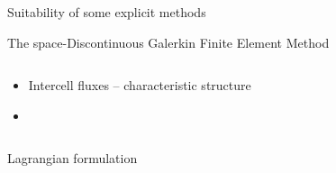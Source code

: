 \begin{withoutheadline}
\begin{frame}{Suitability of some explicit methods}
\begin{block}{The space-Discontinuous Galerkin Finite Element Method \cite{Cockburn}}
\begin{overprint}
\begin{columns}
\begin{footnotesize}
\begin{column}{0.6\textwidth}
              \begin{itemize}
              \item[] Intercell fluxes -- characteristic structure
              \item[] %
              \end{itemize}
            \end{column}
          \end{footnotesize}
        \end{columns}
        \vskip -10pt
        \begin{columns}
          \begin{column}{0.48\textwidth}
            \begin{block}{\footnotesize Lagrangian formulation \cite{LagrangianDG_thesis}}
              \centering
                
                
            \end{block}
          \end{column}
          \begin{column}{0.48\textwidth}
            

\end{column}
\end{columns}
\end{overprint}
\end{block}
\end{frame}
\end{withoutheadline}
